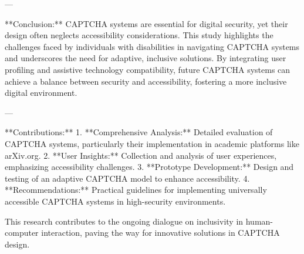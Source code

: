 ---

**Conclusion:**  
CAPTCHA systems are essential for digital security, yet their design often neglects accessibility considerations. This study highlights the challenges faced by individuals with disabilities in navigating CAPTCHA systems and underscores the need for adaptive, inclusive solutions. By integrating user profiling and assistive technology compatibility, future CAPTCHA systems can achieve a balance between security and accessibility, fostering a more inclusive digital environment.

---

**Contributions:**  
1. **Comprehensive Analysis:** Detailed evaluation of CAPTCHA systems, particularly their implementation in academic platforms like arXiv.org.  
2. **User Insights:** Collection and analysis of user experiences, emphasizing accessibility challenges.  
3. **Prototype Development:** Design and testing of an adaptive CAPTCHA model to enhance accessibility.  
4. **Recommendations:** Practical guidelines for implementing universally accessible CAPTCHA systems in high-security environments.  

This research contributes to the ongoing dialogue on inclusivity in human-computer interaction, paving the way for innovative solutions in CAPTCHA design.
